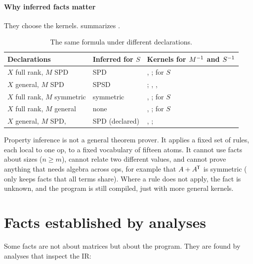 \paragraph{Why inferred facts matter} They choose the kernels.
 summarizes .

\begin{table}[h]
\centering\small
\begin{tabularx}{\linewidth}{@{}P{3.6cm}P{3.0cm}L@{}}
\toprule
\textbf{Declarations} & \textbf{Inferred for \(S\)} & \textbf{Kernels for \(M^{-1}\) and \(S^{-1}\)} \\
\midrule
\(X\) full rank, \(M\) SPD & SPD & , ;  for \(S\) \\
\(X\) general, \(M\) SPD & SPSD & ; , ,  \\
\(X\) full rank, \(M\) symmetric & symmetric & , ;  for \(S\) \\
\(X\) full rank, \(M\) general & none & , ;  for \(S\) \\
\(X\) general, \(M\) SPD,  & SPD (declared) & , ;  \\
\bottomrule
\end{tabularx}
\caption{The same formula under different declarations.}
\label{tab:variants}
\end{table}

\begin{limit}
Property inference is not a general theorem prover. It applies a fixed set
of rules, each local to one op, to a fixed vocabulary of fifteen atoms.
It cannot use facts about sizes (\(n \ge m\)), cannot relate two different
values, and cannot prove anything that needs algebra across ops, for example
that \(A + A^{\mkern-1.5mu\mathsf{T}}\) is symmetric ( only keeps facts that all terms
share). Where a rule does not apply, the fact is unknown, and the program is
still compiled, just with more general kernels.
\end{limit}

\section{Facts established by analyses}
\label{sec:facts-analysis}

Some facts are not about matrices but about the program. They are found by
analyses that inspect the IR:

